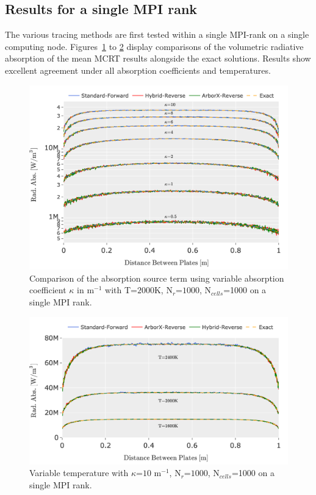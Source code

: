\subsection{Results for a single MPI rank}
The various tracing methods are first tested within a single MPI-rank on a single computing node.
Figures~\ref{fig:PPcomp_kappa} to \ref{fig:PPcomp_temp} display comparisons of the volumetric radiative absorption of the mean MCRT results alongside the exact solutions.
Results show excellent agreement under all absorption coefficients and temperatures. 
\begin{figure}[!ht]
\centering
\includegraphics[width=0.95\linewidth]{figures/ch4/PPcomparison1.png}
\caption{Comparison of the absorption source term using variable absorption coefficient $\kappa{}$ in m$^{-1}$ with T=$2000$K, N$_r$=$1000$, N$_{cells}$=1000 on a single MPI rank.}
\label{fig:PPcomp_kappa}
\end{figure}
\begin{figure}[!ht]
\centering
\includegraphics[width=0.95\linewidth]{figures/ch4/PPcomparison2.png}
\caption{Variable temperature with $\kappa{}$=$10$ m$^{-1}$, N$_r$=$1000$, N$_{cells}$=1000 on a single MPI rank.}
\label{fig:PPcomp_temp}
\end{figure}


